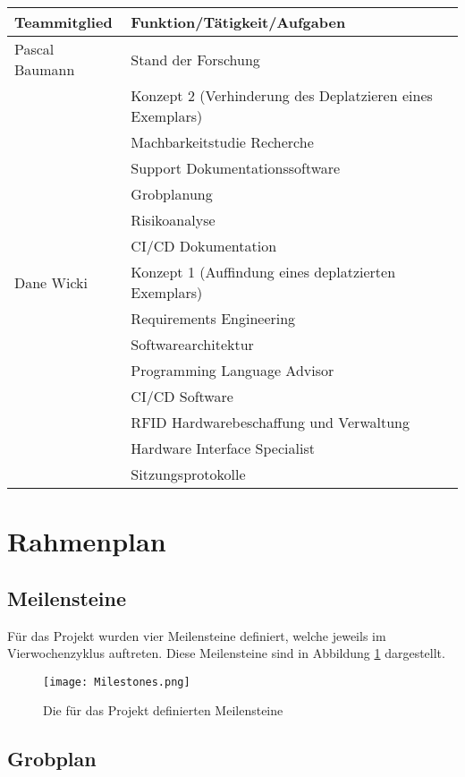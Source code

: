 \begin{tabularx}{\textwidth}{|l|X|}
	\hline
	\textbf{Teammitglied} & \textbf{Funktion/Tätigkeit/Aufgaben} \\
	\hline
	Pascal Baumann & Stand der Forschung \\
		& Konzept 2 (Verhinderung des Deplatzieren eines Exemplars) \\
		& Machbarkeitstudie Recherche \\
		& Support Dokumentationssoftware \\
		& Grobplanung \\
		& Risikoanalyse \\
		& CI/CD Dokumentation \\
	\hline
	Dane Wicki & Konzept 1 (Auffindung eines deplatzierten Exemplars)\\
		& Requirements Engineering \\
		& Softwarearchitektur \\
		& Programming Language Advisor \\
		& CI/CD Software \\
		& RFID Hardwarebeschaffung und Verwaltung \\
		& Hardware Interface Specialist \\
		& Sitzungsprotokolle \\
		
	\hline
\end{tabularx}

\section{Rahmenplan}
\subsection{Meilensteine}
\label{ssec:Meilensteine}
Für das Projekt wurden vier Meilensteine definiert, welche jeweils im Vierwochenzyklus auftreten. Diese Meilensteine sind in Abbildung \ref{fig:Milestones} dargestellt.

\begin{figure}[h!]
	\centering
	\texttt{[image: Milestones.png]}
	\caption{Die für das Projekt definierten Meilensteine}
	\label{fig:Milestones}
\end{figure}

\subsection{Grobplan}

